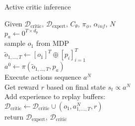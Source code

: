 \begin{algorithm}
    \caption{Active critic inference}
    \label{AC_Inference}
    \begin{algorithmic}
    \Require Given $\mathcal{D}_{\text{critic}}$, $\mathcal{D}_{\text{expert}}$,  
    $C_{\theta}$, $\pi_{\phi}$, $\alpha_{inf}$, $N$\\
    \State $p_a \gets 0^{T \times d_p}$ \hfill{} \\
    \State sample $o_1$ from MDP\\
    \State $\tilde{o}_{1, ..., T} \gets [o_1]^T \oplus [p_i]_{i=1}^T$ \hfill{} \\
    \State $a^0 \gets \pi(\tilde{o}_{1, ..., T}, p_a)$\hfill{} \\
    \State Execute actions sequence $a^N$\\
    \State Get reward $r$ based on final state $s_t \propto a^N$\\
    \State Add experience to replay buffers:\\
    \State $\mathcal{D}_{\text{critic}} \gets \mathcal{D}_{\text{critic}} \cup (o_1, a^N_{1, ..., T}, r)$\\
    return $\mathcal{D}_{\text{expert}}$, $\mathcal{D}_{\text{critic}}$
\end{algorithmic}
\end{algorithm}


